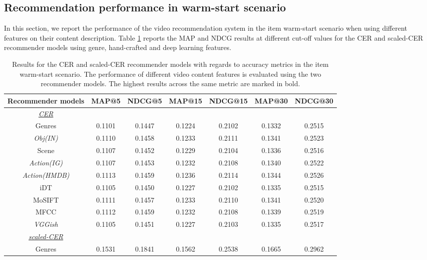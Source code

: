 \documentclass[review]{elsarticle}
\begin{document}
\subsection{Recommendation performance in warm-start scenario}
In this section, we report the performance of the video recommendation system in the item warm-start scenario when using different features on their content description. Table \ref{tab:warmstart_map_ndcg} reports the MAP and NDCG results at different cut-off values for the CER and scaled-CER recommender models using genre, hand-crafted and deep learning features. 





	\begin{table}[H]
\caption{Results for the CER and scaled-CER recommender models with regards to accuracy metrics in the item warm-start scenario. The performance of different video content features is evaluated using the two recommender models. The highest results across the same metric are marked in bold.}
  \label{tab:warmstart_map_ndcg}
  \centering
    \begin{adjustbox}{width=\columnwidth}
    \begin{tabular}{|c|c c c c c c|}
        \cline{1-7}
Recommender models		& MAP@5 	& NDCG@5 	& MAP@15 	& NDCG@15 	& MAP@30 	& NDCG@30 	\\
\midrule
\underline{\textit{CER}} & & & & & & \\
Genres 	&0.1101	&0.1447	&0.1224	&0.2102	&0.1332	&0.2515	\\ 
\textit{Obj(IN)} 	&0.1110	&0.1458	&0.1233	&0.2111	&0.1341	&0.2523	\\
Scene	&0.1107	&0.1452	&0.1229	&0.2104	&0.1336	&0.2516	\\ 
\textit{Action(IG)} 	&0.1107	&0.1453	&0.1232	&0.2108	&0.1340	&0.2522	\\ 
\textit{Action(HMDB)} 	&0.1113	&0.1459	&0.1236	&0.2114	&0.1344	&0.2526	\\ 
iDT 	&0.1105	&0.1450	&0.1227	&0.2102	&0.1335	&0.2515	\\ 
MoSIFT 	&0.1111	&0.1457	&0.1233	&0.2110	&0.1341	&0.2520	\\ 
MFCC 	&0.1112	&0.1459	&0.1232	&0.2108	&0.1339	&0.2519	\\ 
\textit{VGGish} 	&0.1105	&0.1451	&0.1227	&0.2103	&0.1335	&0.2517	\\ 
\midrule
\underline{\textit{scaled-CER}} & & & & & &\\
Genres 	&0.1531	&0.1841	&0.1562	&0.2538	&0.1665	&0.2962	\\ 

\end{tabular}
\end{adjustbox}
\end{table}
\end{document}
